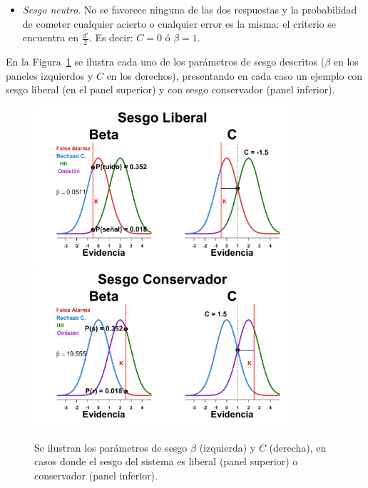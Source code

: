 \begin{itemize}
\begin{itemize}
\item \textsl{Sesgo neutro}. No se favorece ninguna de las dos respuestas y la probabilidad de cometer cualquier acierto o cualquier error es la misma: el criterio se encuentra en $\frac{d'}{2}$. Es decir: $C = 0$  ó $\beta = 1$.
\end{itemize}

En la Figura~\ref{fig:Graf_Sesgo} se ilustra cada uno de los parámetros de sesgo descritos ($\beta$ en los paneles izquierdos y $C$ en los derechos), presentando en cada caso un ejemplo con sesgo liberal (en el panel superior) y con sesgo conservador (panel inferior). \\

\begin{figure}[p]
\centering
\includegraphics[width=0.85\textwidth]{Figures/Graficador_Sesgo_LiberalR}\\
\includegraphics[width=0.85\textwidth]{Figures/Graficador_Sesgo_ConservadorR}\\
\decoRule
\caption[Estimación paramétrica: Sesgos $\beta$ y $c$]{Se ilustran los parámetros de sesgo $\beta$ (izquierda) y $C$ (derecha), en casos donde el sesgo del sistema es liberal (panel superior) o conservador (panel inferior).}
\label{fig:Graf_Sesgo}
\end{figure}

\end{itemize}

